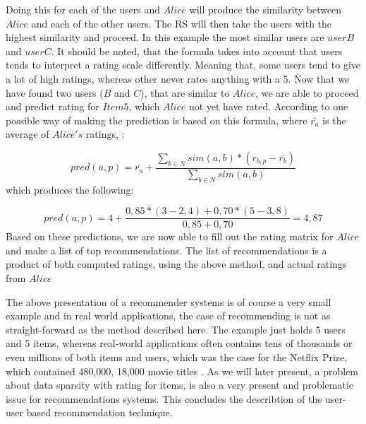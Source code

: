 Doing this for each of the users and \(Alice\) will produce the similarity between \(Alice\) and each of the other users. The RS will then take the users with the highest similarity and proceed. In this example the most similar users are \(userB\) and \(userC\). It should be noted, that the formula takes into account that users tends to interpret a rating scale differently. Meaning that, some users tend to give a lot of high ratings, whereas other never rates anything with a 5\citep[p. 15]{IntroductionRecommenderSystems}.\newline 
Now that we have found two users (\(B\) and \(C\)), that are similar to \(Alice\), we are able to proceed and predict rating for \(Item5\), which \(Alice\) not yet have rated. According to \citep[p. 16]{IntroductionRecommenderSystems} one possible way of making the prediction is based on this formula, where $\bar{r_{a}}$ is the average of \(Alice's\) ratings,  :\newline

\[
	pred(a,p) = \bar{r_{a}} + \frac{\sum_{b\in N} sim(a,b) * (r_{b,p} - \bar{r_{b}})}{\sum_{b\in N} sim(a,b)}
\]
which produces the following: \newline

\[
	pred(a,p) = 4 + \frac{0,85*(3-2,4)+0,70*(5-3,8)}{0,85+0,70} = 4,87
\]
Based on these predictions, we are now able to fill out the rating matrix for \(Alice\) and make a list of top recommendations. The list of recommendations is a product of both computed ratings, using the above method, and actual ratings from \(Alice\) \newline

The above presentation of a recommender systems is of course a very small example and in real world applications, the case of recommending is not as straight-forward as the method described here. The example just holds 5 users and 5 items, whereas real-world applications often contains tens of thousands or even millions of both items and users, which was the case for the Netflix Prize, which contained 480,000, 18,000 movie titles \citep{NetflixPrize}. As we will later present, a problem about data sparsity with rating for items, is also a very present and problematic issue for recommendations systems. \newline
This concludes the describtion of the user-user based recommendation technique.


